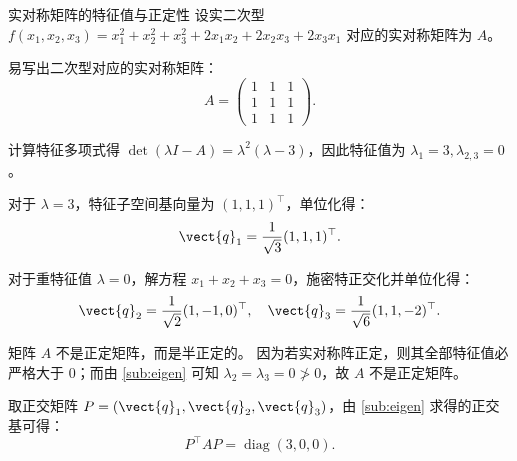 \begin{problem}[20]{实对称矩阵的特征值与正定性}
\label{sec:matrix}
设实二次型 $f(x_1, x_2, x_3) = x_1^2 + x_2^2 + x_3^2 + 2x_1 x_2 + 2x_2 x_3 + 2x_3 x_1$ 对应的实对称矩阵为 $A$。
\end{problem}

\begin{subproblems}
  \begin{solution}
    易写出二次型对应的实对称矩阵：
    \[
      A = \begin{pmatrix} 1 & 1 & 1 \\ 1 & 1 & 1 \\ 1 & 1 & 1 \end{pmatrix}.
    \]

    计算特征多项式得 $\det(\lambda I - A) = \lambda^2(\lambda - 3)$，因此特征值为 $\lambda_1 = 3, \lambda_{2,3} = 0$。
    
    对于 $\lambda = 3$，特征子空间基向量为 $(1, 1, 1)^\top$，单位化得：
    \[
      \vect{q}_1 = \frac{1}{\sqrt{3}}(1, 1, 1)^\top.
    \]

    对于重特征值 $\lambda = 0$，解方程 $x_1 + x_2 + x_3 = 0$，施密特正交化并单位化得：
    \[
      \vect{q}_2 = \frac{1}{\sqrt{2}}(1, -1, 0)^\top, \quad
      \vect{q}_3 = \frac{1}{\sqrt{6}}(1, 1, -2)^\top.
    \]
  \end{solution}

  \begin{solution}
    矩阵 $A$ 不是正定矩阵，而是半正定的。
    因为若实对称阵正定，则其全部特征值必严格大于 $0$；而由 \cref{sub:eigen} 可知 $\lambda_2 = \lambda_3 = 0 \ngtr 0$，故 $A$ 不是正定矩阵。

    取正交矩阵 $P = (\vect{q}_1, \vect{q}_2, \vect{q}_3)$，由 \cref{sub:eigen} 求得的正交基可得：
    \[
      P^\top A P = \operatorname{diag}(3, 0, 0).
    \]
  \end{solution}
\end{subproblems}
